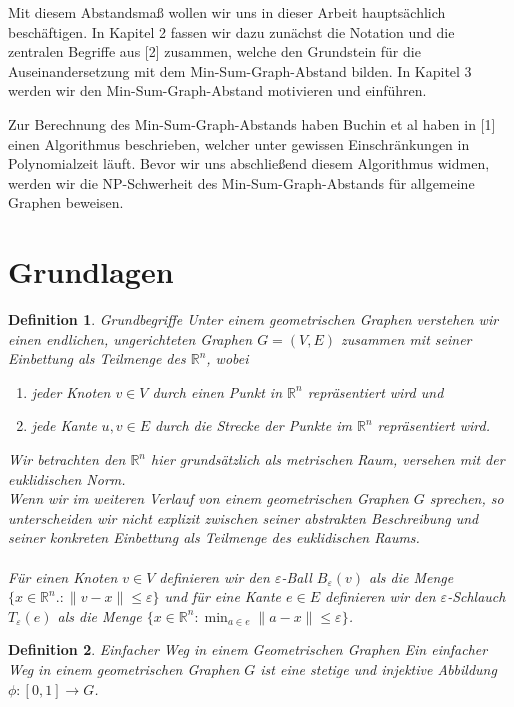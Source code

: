 \documentclass[a4paper, 12pt, twoside]{article}
\theoremstyle{Format1} %
\newtheorem{Def}{Definition}[section]       %
\begin{document}
Mit diesem Abstandsmaß wollen wir uns in dieser Arbeit hauptsächlich beschäftigen.
In Kapitel 2 fassen wir dazu zunächst die Notation und die zentralen Begriffe aus [2] zusammen, welche den Grundstein für die Auseinandersetzung mit dem Min-Sum-Graph-Abstand bilden.
In Kapitel 3 werden wir den Min-Sum-Graph-Abstand motivieren und einführen.

Zur Berechnung des Min-Sum-Graph-Abstands haben Buchin et al haben in [1] einen Algorithmus beschrieben, welcher unter gewissen Einschränkungen in Polynomialzeit läuft.
Bevor wir uns abschließend diesem Algorithmus widmen, werden wir die NP-Schwerheit des Min-Sum-Graph-Abstands für allgemeine Graphen beweisen.
\newpage

\section{Grundlagen}

\begin{Def}
	Grundbegriffe
	Unter einem \textit{geometrischen Graphen} verstehen wir einen endlichen, ungerichteten Graphen $G=(V, E)$ zusammen mit seiner Einbettung als Teilmenge des $ \mathbb{R}^n $, wobei
    	\begin{enumerate}
		\item[1)] jeder Knoten $v \in V $ durch einen Punkt in $ \mathbb{R}^n $ repräsentiert wird und
		\item[2)] jede Kante ${u,v} \in E$ durch die Strecke der Punkte im $ \mathbb{R}^n $ repräsentiert wird.
    	\end{enumerate}

	Wir betrachten den $ \mathbb{R}^n $ hier grundsätzlich als metrischen Raum, versehen mit der euklidischen Norm.
	\\
	Wenn wir im weiteren Verlauf von einem geometrischen Graphen $G$ sprechen, so unterscheiden wir nicht explizit zwischen seiner abstrakten
	Beschreibung und seiner konkreten Einbettung als Teilmenge des euklidischen Raums.
	\\
	\\
	Für einen Knoten $v \in V$ definieren wir den \textit{$\varepsilon$-Ball} $B_{\varepsilon}(v)$ als die Menge
	$\{x \in \mathbb{R}^n.: \|v-x\| \leq \varepsilon\}$
	und für eine Kante $e \in E$ definieren wir den \textit{$\varepsilon$-Schlauch} $T_{\varepsilon}(e)$ als die Menge
	$\{x \in \mathbb{R}^n: \min_{a \in e}\|a-x\| \leq \varepsilon\}$.
\end{Def}

\begin{Def}
	Einfacher Weg in einem Geometrischen Graphen
	Ein \textit{einfacher Weg} in einem geometrischen Graphen $G$ ist eine stetige und injektive Abbildung $ \phi: [0, 1] \to G$.
\end{Def}
\end{document}
